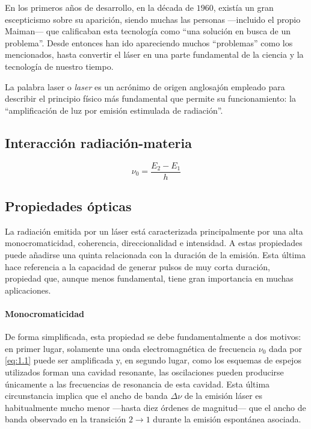 En los primeros años de desarrollo, en la década de $1960$, existía un gran escepticismo sobre su aparición, siendo muchas las personas ---incluido el propio Maiman--- que calificaban esta tecnología como \enquote{una solución en busca de un problema}. Desde entonces han ido apareciendo muchos \enquote{problemas} como los mencionados, hasta convertir el láser en una parte fundamental de la ciencia y la tecnología de nuestro tiempo.

La palabra \acrshort{laser} o \emph{\acrlong{laser}} es un acrónimo de origen anglosajón empleado para describir el principio físico más fundamental que permite su funcionamiento: la \enquote{amplificación de luz por emisión estimulada de radiación}.

\subsection{Interacción radiación-materia}\label{sec:1.1.1}

\begin{equation}\label{eq:1.1}
    \nu_0 = \dfrac{E_2-E_1}{h}
\end{equation}

\subsection{Propiedades ópticas}\label{sec:1.1.2}
La radiación emitida por un láser está caracterizada principalmente por una alta monocromaticidad, coherencia, direccionalidad e intensidad. A estas propiedades puede añadirse una quinta relacionada con la duración de la emisión\autocite{sveltoPrinciplesLasers2010}. Esta última hace referencia a la capacidad de generar pulsos de muy corta duración, propiedad que, aunque menos fundamental, tiene gran importancia en muchas aplicaciones. 

\paragraph{Monocromaticidad}\label{par:1.1.2.1}
De forma simplificada, esta propiedad se debe fundamentalmente a dos motivos: en primer lugar, solamente una onda electromagnética de frecuencia $\nu_0$ dada por \eqref{eq:1.1} puede ser amplificada y, en segundo lugar, como los esquemas de espejos utilizados forman una cavidad resonante, las oscilaciones pueden producirse únicamente a las frecuencias de resonancia de esta cavidad. Esta última circunstancia implica que el ancho de banda $\Delta\nu$ de la emisión láser es habitualmente mucho menor ---hasta diez órdenes de magnitud--- que el ancho de banda observado en la transición $2\rightarrow 1$ durante la emisión espontánea asociada.

